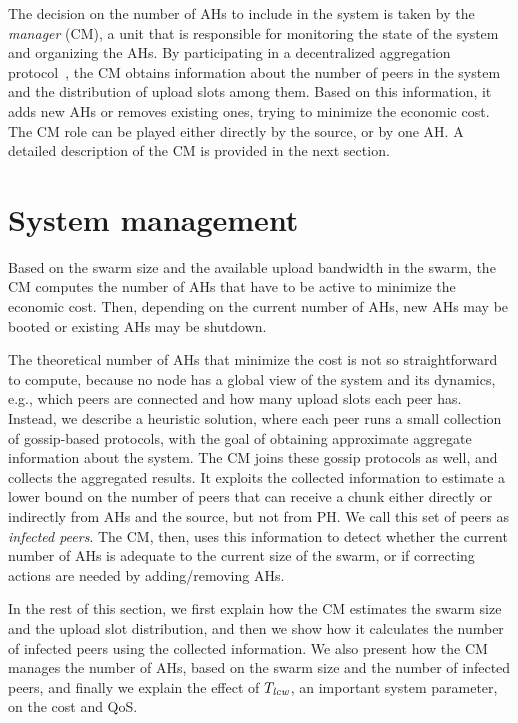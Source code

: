 The decision on the number of AHs to include in the system is taken by the
\emph{\clive manager} (CM), a unit that is responsible for monitoring the
state of the system and organizing the AHs. By participating in a
decentralized aggregation protocol~\cite{aggregation}, the CM obtains
information about the number of peers in the system and the distribution of
upload slots among them. Based on this information, it adds new AHs or removes
existing ones, trying to minimize the economic cost. The CM role can be played
either directly by the source, or by one AH. A detailed description of the CM
is provided in the next section.

\section{System management} \label{sec:cmmanager}

Based on the swarm size and the available upload bandwidth in the swarm, the CM
computes the number of AHs that have to be active to minimize the economic
cost. Then, depending on the current number of AHs, new AHs may be booted or
existing AHs may be shutdown.

The theoretical number of AHs that minimize the cost is not so straightforward
to compute, because no node has a global view of the system and its dynamics,
e.g., which peers are connected and how many upload slots each peer has.
Instead, we describe a heuristic solution, where each peer runs a small
collection of gossip-based protocols, with the goal of obtaining approximate
aggregate information about the system. The CM joins these gossip protocols as
well, and collects the aggregated results. It exploits the collected
information to estimate a lower bound on the number of peers that can receive
a chunk either directly or indirectly from AHs and the source, but not from
PH. We call this set of peers as {\em infected peers}. The CM, then, uses this
information to detect whether the current number of AHs is adequate to the
current size of the swarm, or if correcting actions are needed by
adding/removing AHs.

In the rest of this section, we first explain how the CM estimates the swarm size
and the upload slot distribution, and then we show how it calculates the
number of infected peers using the collected information. We also present how
the CM manages the number of AHs, based on the swarm size and the number of
infected peers, and finally we explain the effect of $T_{\mathit{lcw}}$, an important
system parameter, on the cost and QoS.

